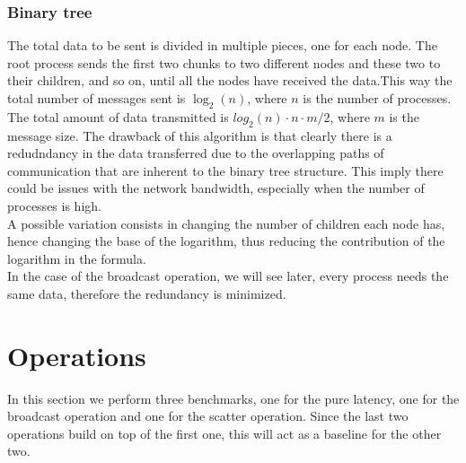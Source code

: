 \subsubsection{Binary tree}
    The total data to be sent is divided in multiple pieces, one
    for each node. The root process sends the first two chunks to
    two different nodes and these two to their children, and so on,
    until all the nodes have received the data.This way the total number
    of messages sent is $\log_2(n)$, where $n$ is the number of processes.
    The total amount of data transmitted is $log_2(n) \cdot n \cdot m/2$,
    where $m$ is the message size. The drawback of this algorithm is that clearly
    there is a redudndancy in the data transferred due to the
    overlapping paths of communication that are inherent to the binary
    tree structure. This imply there could be issues with the network
    bandwidth, especially when the number of processes is high. \\
    A possible variation consists in changing the number of children each
    node has, hence changing the base of the logarithm, thus reducing
    the contribution of the logarithm in the formula.
    \\
    In the case of the broadcast operation, we will see later,
    every process needs the same data, therefore the redundancy
    is minimized.

\section{Operations}
    In this section we perform three benchmarks, one for the pure
    latency, one for the broadcast operation and one for the scatter
    operation. Since the last two operations build on top of the
    first one, this will act as a baseline for the other two.




    




